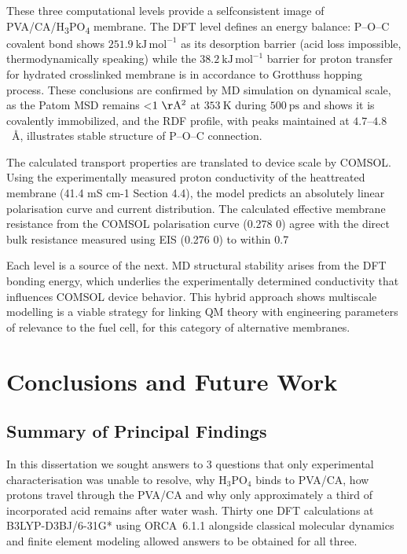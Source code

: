 \documentclass[12pt,a4paper]{report}
\begin{document}
These three computational levels provide a selfconsistent image of PVA/CA/H\textsubscript{3}PO\textsubscript{4} membrane. The DFT level defines an energy balance: P--O--C covalent bond shows $251.9\ \mathrm{kJ\,mol^{-1}}$ as its desorption barrier (acid loss impossible, thermodynamically speaking) while the $38.2\ \mathrm{kJ\,mol^{-1}}$ barrier for proton transfer for hydrated crosslinked membrane is in accordance to Grotthuss hopping process. These conclusions are confirmed by MD simulation on dynamical scale, as the Patom MSD remains <$1\ \mathrm{\AA^2}$ at $353\ \mathrm{K}$ during $500\ \mathrm{ps}$ and shows it is covalently immobilized, and the RDF profile, with peaks maintained at $4.7$--$4.8$\ \AA, illustrates stable structure of P--O--C connection.

The calculated transport properties are translated to device scale by COMSOL. Using the experimentally measured proton conductivity of the heattreated membrane (41.4 mS cm-1 Section 4.4), the model predicts an absolutely linear polarisation curve and current distribution. The calculated effective membrane resistance from the COMSOL polarisation curve (0.278 0) agree with the direct bulk resistance measured using EIS (0.276 0) to within 0.7 %

Each level is a source of the next. MD structural stability arises from the DFT bonding energy, which underlies the experimentally determined conductivity that influences COMSOL device behavior. This hybrid approach shows multiscale modelling is a viable strategy for linking QM theory with engineering parameters of relevance to the fuel cell, for this category of alternative membranes. \cite{64}

\chapter{Conclusions and Future Work}

\section{Summary of Principal Findings}

In this dissertation we sought answers to 3 questions that only experimental characterisation was unable to resolve, why H$_3$PO$_4$ binds to PVA/CA, how protons travel through the PVA/CA and why only approximately a third of incorporated acid remains after water wash. Thirty one DFT calculations at B3LYP-D3BJ/6-31G* using ORCA~6.1.1 alongside classical molecular dynamics and finite element modeling allowed answers to be obtained for all three.
\end{document}

